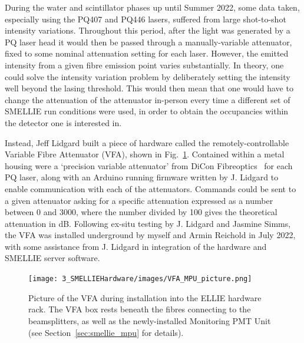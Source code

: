 During the water and scintillator phases up until Summer 2022, some data taken, especially using the PQ407 and PQ446 lasers, suffered from large shot-to-shot intensity variations. Throughout this period, after the light was generated by a PQ laser head it would then be passed through a manually-variable attenuator, fixed to some nominal attenuation setting for each laser. However, the emitted intensity from a given fibre emission point varies substantially. In theory, one could solve the intensity variation problem by deliberately setting the intensity well beyond the lasing threshold. This would then mean that one would have to change the attenuation of the attenuator in-person every time a different set of SMELLIE run conditions were used, in order to obtain the occupancies within the detector one is interested in.

Instead, Jeff Lidgard built a piece of hardware called the remotely-controllable Variable Fibre Attenuator (VFA), shown in Fig.~\ref{fig:vfa_picture}. Contained within a metal housing were a `precision variable attenuator' from DiCon Fibreoptics~\cite{diconfibreoptics30dBPrecisionVariable2017} %
for each PQ laser, along with an Arduino running firmware written by J. Lidgard to enable communication with each of the attenuators. Commands could be sent to a given attenuator asking for a specific attenuation expressed as a number between 0 and 3000, where the number divided by 100 gives the theoretical attenuation in \si{\dB}. Following ex-situ testing by J. Lidgard and Jasmine Simms, the VFA was installed underground by myself and Armin Reichold in July 2022, with some assistance from J. Lidgard in integration of the hardware and SMELLIE server software.

\begin{figure}
    \centering
    \texttt{[image: 3\_SMELLIEHardware/images/VFA\_MPU\_picture.png]}
    \caption[Picture of the VFA during installation into the ELLIE hardware rack]
    {Picture of the VFA during installation into the ELLIE hardware rack. The VFA box rests beneath the fibres connecting to the beamsplitters, as well as the newly-installed Monitoring PMT Unit (see Section~\ref{sec:smellie_mpu} for details).}
    \label{fig:vfa_picture}
\end{figure}

